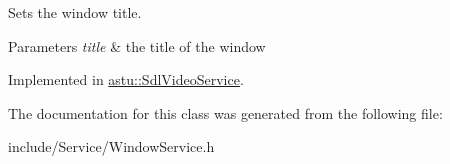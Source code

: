 Sets the window title.


\begin{DoxyParams}{Parameters}
{\em title} & the title of the window \\
\hline
\end{DoxyParams}


Implemented in \hyperlink{classastu_1_1SdlVideoService_aad3c873db481dd622d6ddcea70b279af}{astu\+::\+Sdl\+Video\+Service}.



The documentation for this class was generated from the following file\+:\begin{DoxyCompactItemize}
\item 
include/\+Service/Window\+Service.\+h\end{DoxyCompactItemize}
